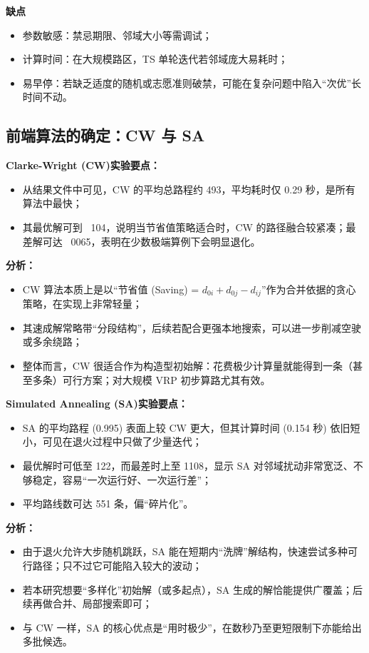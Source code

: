 \documentclass[12pt,a4paper,twoside]{ctexbook}
\begin{document}
\textbf{缺点}
\begin{itemize}
    \item 参数敏感：禁忌期限、邻域大小等需调试；
    \item 计算时间：在大规模路区，TS 单轮迭代若邻域庞大易耗时；
    \item 易早停：若缺乏适度的随机或志愿准则破禁，可能在复杂问题中陷入“次优”长时间不动。
\end{itemize}

\subsection{前端算法的确定：CW 与 SA}
\textbf{Clarke-Wright (CW)实验要点：}
\begin{itemize}
    \item 从结果文件中可见，CW 的平均总路程约 493，平均耗时仅 0.29 秒，是所有算法中最快；
    \item 其最优解可到 ~104，说明当节省值策略适合时，CW 的路径融合较紧凑；最差解可达 ~0065，表明在少数极端算例下会明显退化。
\end{itemize}

\textbf{分析：}
\begin{itemize}
    \item CW 算法本质上是以“节省值 (Saving) = $d_{0i} + d_{0j} - d_{ij}$”作为合并依据的贪心策略，在实现上非常轻量；
    \item 其速成解常略带“分段结构”，后续若配合更强本地搜索，可以进一步削减空驶或多余绕路；
    \item 整体而言，CW 很适合作为构造型初始解：花费极少计算量就能得到一条（甚至多条）可行方案；对大规模 VRP 初步算路尤其有效。
\end{itemize}

\textbf{Simulated Annealing (SA)实验要点：}
\begin{itemize}
    \item SA 的平均路程 (0.995) 表面上较 CW 更大，但其计算时间 (0.154 秒) 依旧短小，可见在退火过程中只做了少量迭代；
    \item 最优解时可低至 122，而最差时上至 1108，显示 SA 对邻域扰动非常宽泛、不够稳定，容易“一次运行好、一次运行差”；
    \item 平均路线数可达 551 条，偏“碎片化”。
\end{itemize}

\textbf{分析：}
\begin{itemize}
    \item 由于退火允许大步随机跳跃，SA 能在短期内“洗牌”解结构，快速尝试多种可行路径；只不过它可能陷入较大的波动；
    \item 若本研究想要“多样化”初始解（或多起点），SA 生成的解恰能提供广覆盖；后续再做合并、局部搜索即可；
    \item 与 CW 一样，SA 的核心优点是“用时极少”，在数秒乃至更短限制下亦能给出多批候选。
\end{itemize}
\end{document}
